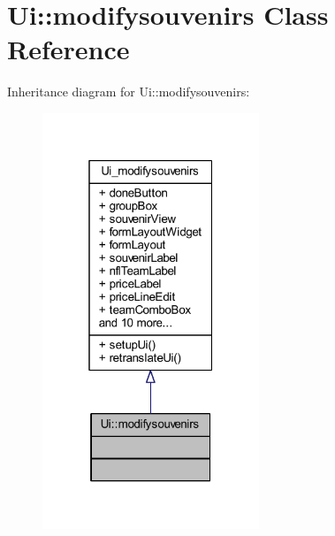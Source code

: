 \hypertarget{class_ui_1_1modifysouvenirs}{}\section{Ui\+:\+:modifysouvenirs Class Reference}
\label{class_ui_1_1modifysouvenirs}


Inheritance diagram for Ui\+:\+:modifysouvenirs\+:
\nopagebreak
\begin{figure}[H]
\begin{center}
\leavevmode
\includegraphics[width=184pt]{class_ui_1_1modifysouvenirs__inherit__graph}
\end{center}
\end{figure}


